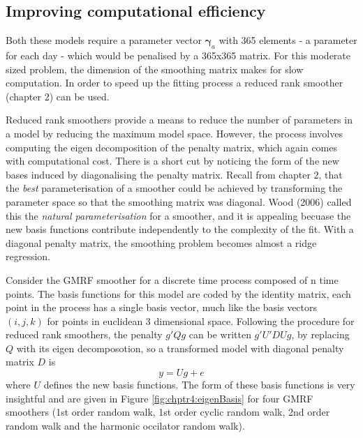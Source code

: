 


\subsection{Improving computational efficiency}


Both these models require a parameter vector $\bm{\gamma}_a$ with 365 elements - a parameter for each day - which would be penalised by a 365x365 matrix.  For this moderate sized problem, the dimension of the smoothing matrix makes for slow computation.  In order to speed up the fitting process a reduced rank smoother (chapter 2) can be used.  

Reduced rank smoothers provide a means to reduce the number of parameters in a model by reducing the maximum model space.  However, the process involves computing the eigen decomposition of the penalty matrix, which again comes with computational cost.  There is a short cut by noticing the form of the new bases induced by diagonalising the penalty matrix.  Recall from chapter 2, that the \textit{best} parameterisation of a smoother could be achieved by transforming the parameter space so that the smoothing matrix was diagonal.  Wood (2006) called this the \textit{natural parameterisation} for a smoother, and it is appealing becuase the new basis functions contribute independently to the complexity of the fit.  With a diagonal penalty matrix, the smoothing problem becomes almost a ridge regression.

Consider the GMRF smoother for a discrete time process composed of n time points. The basis functions for this model are coded by the identity matrix, each point in the process has a single basis vector, much like the basis vectors $(i, j, k)$ for points in euclidean 3 dimensional space. Following the procedure for reduced rank smoothers, the penalty $g'Qg$ can be written $g'U'DUg$, by replacing $Q$ with its eigen decomposotion, so a transformed model with diagonal penalty matrix $D$ is
\begin{equation}
  y = Ug + e
\end{equation}
where $U$ defines the new basis functions.  The form of these basis functions is very insightful and are given in Figure \ref{fig:chptr4:eigenBasis} for four GMRF smoothers (1st order random walk, 1st order cyclic random walk, 2nd order random walk and the harmonic occilator random walk).

